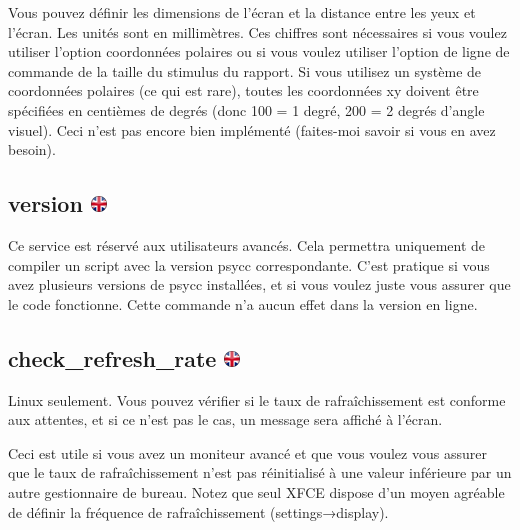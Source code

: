 \documentclass[
]{book}
\begin{document}
Vous pouvez définir les dimensions de l'écran et la distance entre les yeux et l'écran. Les unités sont en millimètres. Ces chiffres sont nécessaires si vous voulez utiliser l'option coordonnées polaires ou si vous voulez utiliser l'option de ligne de commande de la taille du stimulus du rapport. Si vous utilisez un système de coordonnées polaires (ce qui est rare), toutes les coordonnées xy doivent être spécifiées en centièmes de degrés (donc 100 = 1 degré, 200 = 2 degrés d'angle visuel). Ceci n'est pas encore bien implémenté (faites-moi savoir si vous en avez besoin).

\hypertarget{version}{%
\subsection[version ]{\texorpdfstring{version \href{https://www.psytoolkit.org/doc3.4.0/syntax.html\#options-version}{\protect\includegraphics{img/ukflag.png}}}{version }}\label{version}}

Ce service est réservé aux utilisateurs avancés. Cela permettra uniquement de compiler un script avec la version psycc correspondante. C'est pratique si vous avez plusieurs versions de psycc installées, et si vous voulez juste vous assurer que le code fonctionne. Cette commande n'a aucun effet dans la version en ligne.

\hypertarget{check_refresh_rate}{%
\subsection[check\_refresh\_rate ]{\texorpdfstring{check\_refresh\_rate \href{https://www.psytoolkit.org/doc3.4.0/syntax.html\#options-check-refresh-rate}{\protect\includegraphics{img/ukflag.png}}}{check\_refresh\_rate }}\label{check_refresh_rate}}

Linux seulement. Vous pouvez vérifier si le taux de rafraîchissement est conforme aux attentes, et si ce n'est pas le cas, un message sera affiché à l'écran.

Ceci est utile si vous avez un moniteur avancé et que vous voulez vous assurer que le taux de rafraîchissement n'est pas réinitialisé à une valeur inférieure par un autre gestionnaire de bureau. Notez que seul XFCE dispose d'un moyen agréable de définir la fréquence de rafraîchissement (settings→display).
\end{document}
